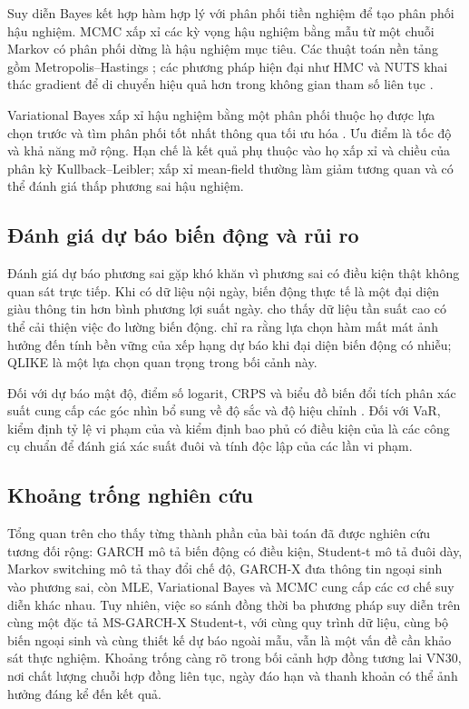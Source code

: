 \documentclass[12pt,a4paper]{article}
\numberwithin{equation}{section}
\begin{document}
Suy diễn Bayes kết hợp hàm hợp lý với phân phối tiền nghiệm để tạo phân phối hậu nghiệm. MCMC xấp xỉ các kỳ vọng hậu nghiệm bằng mẫu từ một chuỗi Markov có phân phối dừng là hậu nghiệm mục tiêu. Các thuật toán nền tảng gồm Metropolis--Hastings \cite{metropolis1953,hastings1970}; các phương pháp hiện đại như HMC và NUTS khai thác gradient để di chuyển hiệu quả hơn trong không gian tham số liên tục \cite{hoffman2014}.

Variational Bayes xấp xỉ hậu nghiệm bằng một phân phối thuộc họ được lựa chọn trước và tìm phân phối tốt nhất thông qua tối ưu hóa \cite{jordan1999,blei2017}. Ưu điểm là tốc độ và khả năng mở rộng. Hạn chế là kết quả phụ thuộc vào họ xấp xỉ và chiều của phân kỳ Kullback--Leibler; xấp xỉ mean-field thường làm giảm tương quan và có thể đánh giá thấp phương sai hậu nghiệm.

\subsection{Đánh giá dự báo biến động và rủi ro}\label{subsec:evaluation-review}

Đánh giá dự báo phương sai gặp khó khăn vì phương sai có điều kiện thật không quan sát trực tiếp. Khi có dữ liệu nội ngày, biến động thực tế là một đại diện giàu thông tin hơn bình phương lợi suất ngày. \cite{andersen1998} cho thấy dữ liệu tần suất cao có thể cải thiện việc đo lường biến động. \cite{patton2011} chỉ ra rằng lựa chọn hàm mất mát ảnh hưởng đến tính bền vững của xếp hạng dự báo khi đại diện biến động có nhiễu; QLIKE là một lựa chọn quan trọng trong bối cảnh này.

Đối với dự báo mật độ, điểm số logarit, CRPS và biểu đồ biến đổi tích phân xác suất cung cấp các góc nhìn bổ sung về độ sắc và độ hiệu chỉnh \cite{gneiting2007,gneiting2007calibration}. Đối với VaR, kiểm định tỷ lệ vi phạm của \cite{kupiec1995} và kiểm định bao phủ có điều kiện của \cite{christoffersen1998} là các công cụ chuẩn để đánh giá xác suất đuôi và tính độc lập của các lần vi phạm.

\subsection{Khoảng trống nghiên cứu}\label{subsec:khoang-trong}

Tổng quan trên cho thấy từng thành phần của bài toán đã được nghiên cứu tương đối rộng: GARCH mô tả biến động có điều kiện, Student-t mô tả đuôi dày, Markov switching mô tả thay đổi chế độ, GARCH-X đưa thông tin ngoại sinh vào phương sai, còn MLE, Variational Bayes và MCMC cung cấp các cơ chế suy diễn khác nhau. Tuy nhiên, việc so sánh đồng thời ba phương pháp suy diễn trên cùng một đặc tả MS-GARCH-X Student-t, với cùng quy trình dữ liệu, cùng bộ biến ngoại sinh và cùng thiết kế dự báo ngoài mẫu, vẫn là một vấn đề cần khảo sát thực nghiệm. Khoảng trống càng rõ trong bối cảnh hợp đồng tương lai VN30, nơi chất lượng chuỗi hợp đồng liên tục, ngày đáo hạn và thanh khoản có thể ảnh hưởng đáng kể đến kết quả.
\end{document}
